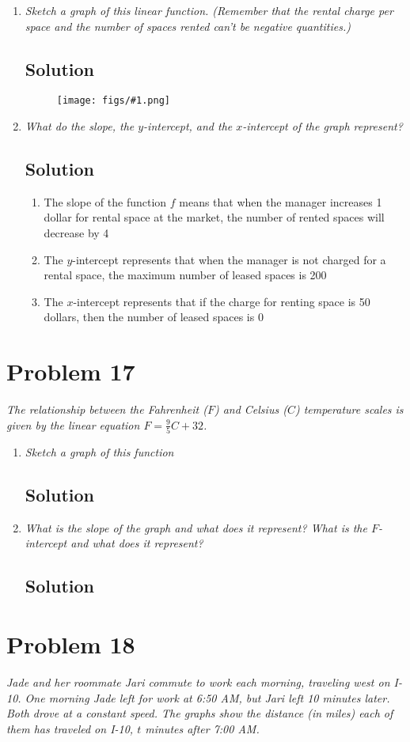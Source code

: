 \documentclass[11pt]{article}
\newcommand{\soln}{\subsection*}
\newcommand{\qn}{\textit}
\newcommand{\imgsoln}[1]{
	\begin{figure}[H]
		\centering
		\texttt{[image: figs/\#1.png]}
	\end{figure}
}
\begin{document}
\begin{enumerate}
	\item \qn{Sketch a graph of this linear function. (Remember that the rental charge per space and the number of spaces rented can't be negative quantities.)}
	\soln{Solution}
	\imgsoln{1.2.16-ans.a}
	
	\item \qn{What do the slope, the $y$-intercept, and the $x$-intercept of the graph represent?}
	\soln{Solution}
	\begin{enumerate}
		\item The slope of the function $f$ means that when the manager increases 1 dollar for rental space at the market, the number of rented spaces will decrease by 4
		
		\item The $y$-intercept represents that when the manager is not charged for a rental space, the maximum number of leased spaces is 200
		
		\item The $x$-intercept represents that if the charge for renting space is 50 dollars, then the number of leased spaces is 0
	\end{enumerate}
\end{enumerate}

\section*{Problem 17}

\qn{The relationship between the Fahrenheit ($F$) and Celsius ($C$) temperature scales is given by the linear equation $F=\frac{9}{5}C+32$.}

\begin{enumerate}
	\item \qn{Sketch a graph of this function}
	\soln{Solution}
	
	\item \qn{What is the slope of the graph and what does it represent? What is the $F$-intercept and what does it represent?}
	\soln{Solution}
\end{enumerate}

\section*{Problem 18}

\qn{Jade and her roommate Jari commute to work each morning, traveling west on I-10. One morning Jade left for work at 6:50 AM, but Jari left 10 minutes later. Both drove at a constant speed. The graphs show the distance (in miles) each of them has traveled on I-10, $t$ minutes after 7:00 AM.}
\end{document}
